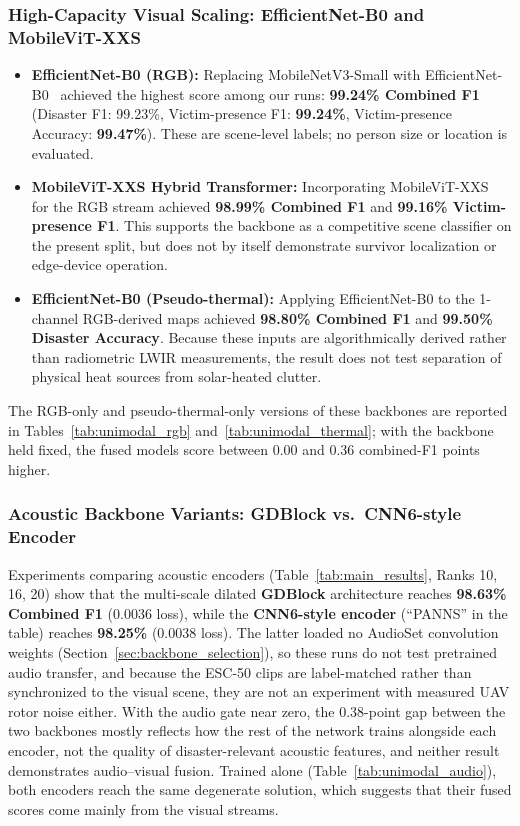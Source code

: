 \documentclass[journal]{IEEEtran}
\begin{document}
\subsubsection{High-Capacity Visual Scaling: EfficientNet-B0 and MobileViT-XXS}
\begin{itemize}
    \item \textbf{EfficientNet-B0 (RGB):} Replacing MobileNetV3-Small with EfficientNet-B0~\cite{tan2019efficientnet} achieved the highest score among our runs: \textbf{99.24\% Combined F1} (Disaster F1: 99.23\%, Victim-presence F1: \textbf{99.24\%}, Victim-presence Accuracy: \textbf{99.47\%}). These are scene-level labels; no person size or location is evaluated.
    \item \textbf{MobileViT-XXS Hybrid Transformer:} Incorporating MobileViT-XXS~\cite{mehta2022mobilevit} for the RGB stream achieved \textbf{98.99\% Combined F1} and \textbf{99.16\% Victim-presence F1}. This supports the backbone as a competitive scene classifier on the present split, but does not by itself demonstrate survivor localization or edge-device operation.
    \item \textbf{EfficientNet-B0 (Pseudo-thermal):} Applying EfficientNet-B0 to the 1-channel RGB-derived maps achieved \textbf{98.80\% Combined F1} and \textbf{99.50\% Disaster Accuracy}. Because these inputs are algorithmically derived rather than radiometric LWIR measurements, the result does not test separation of physical heat sources from solar-heated clutter.
\end{itemize}
The RGB-only and pseudo-thermal-only versions of these backbones are reported in Tables~\ref{tab:unimodal_rgb} and~\ref{tab:unimodal_thermal}; with the backbone held fixed, the fused models score between 0.00 and 0.36 combined-F1 points higher.

\subsubsection{Acoustic Backbone Variants: GDBlock vs.\ CNN6-style Encoder}
Experiments comparing acoustic encoders (Table~\ref{tab:main_results}, Ranks 10, 16, 20) show that the multi-scale dilated \textbf{GDBlock} architecture reaches \textbf{98.63\% Combined F1} (0.0036 loss), while the \textbf{CNN6-style encoder} (``PANNS'' in the table) reaches \textbf{98.25\%} (0.0038 loss). The latter loaded no AudioSet convolution weights (Section~\ref{sec:backbone_selection}), so these runs do not test pretrained audio transfer, and because the ESC-50 clips are label-matched rather than synchronized to the visual scene, they are not an experiment with measured UAV rotor noise either. With the audio gate near zero, the 0.38-point gap between the two backbones mostly reflects how the rest of the network trains alongside each encoder, not the quality of disaster-relevant acoustic features, and neither result demonstrates audio--visual fusion. Trained alone (Table~\ref{tab:unimodal_audio}), both encoders reach the same degenerate solution, which suggests that their fused scores come mainly from the visual streams.
\end{document}
